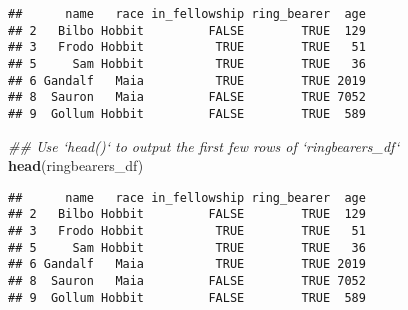 \documentclass[
]{article}
\newenvironment{Shaded}{\begin{snugshade}}{\end{snugshade}}
\newcommand{\CommentTok}[1]{\textcolor[rgb]{0.56,0.35,0.01}{\textit{#1}}}
\newcommand{\KeywordTok}[1]{\textcolor[rgb]{0.13,0.29,0.53}{\textbf{#1}}}
\newcommand{\NormalTok}[1]{#1}
\begin{document}
\begin{verbatim}
##      name   race in_fellowship ring_bearer  age
## 2   Bilbo Hobbit         FALSE        TRUE  129
## 3   Frodo Hobbit          TRUE        TRUE   51
## 5     Sam Hobbit          TRUE        TRUE   36
## 6 Gandalf   Maia          TRUE        TRUE 2019
## 8  Sauron   Maia         FALSE        TRUE 7052
## 9  Gollum Hobbit         FALSE        TRUE  589
\end{verbatim}

\begin{Shaded}
\begin{Highlighting}[]
\CommentTok{## Use `head()` to output the first few rows of `ringbearers_df`}
\KeywordTok{head}\NormalTok{(ringbearers_df)}
\end{Highlighting}
\end{Shaded}

\begin{verbatim}
##      name   race in_fellowship ring_bearer  age
## 2   Bilbo Hobbit         FALSE        TRUE  129
## 3   Frodo Hobbit          TRUE        TRUE   51
## 5     Sam Hobbit          TRUE        TRUE   36
## 6 Gandalf   Maia          TRUE        TRUE 2019
## 8  Sauron   Maia         FALSE        TRUE 7052
## 9  Gollum Hobbit         FALSE        TRUE  589
\end{verbatim}
\end{document}
